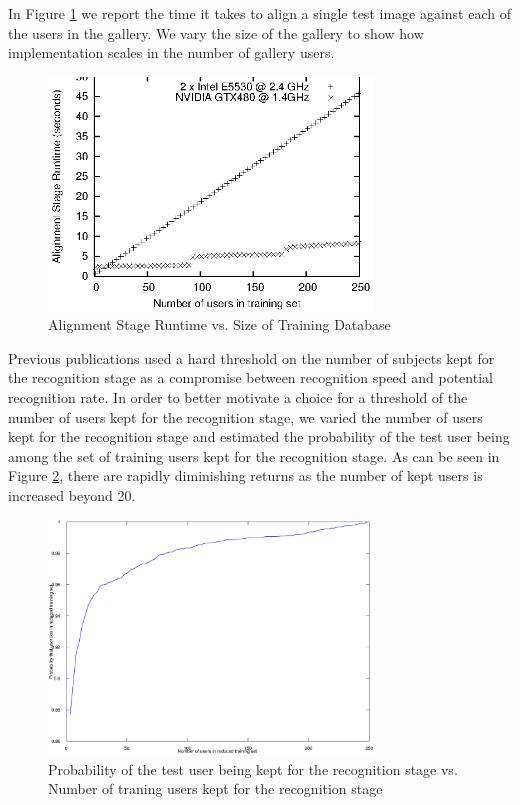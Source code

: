 \documentclass[10pt,twocolumn,letterpaper]{article}
\begin{document}
In Figure \ref{fig:alignment_stage_runtime} we report the time it takes
to align a single test image against each of the users in the gallery.
We vary the size of the gallery to show how implementation scales in the
number of gallery users.
\begin{figure}
\centering
\includegraphics[width=3.4in]{figures/alignment_runtime_graph}
\caption{Alignment Stage Runtime vs. Size of Training Database}
\label{fig:alignment_stage_runtime}
\end{figure}

Previous publications used a hard threshold on the number of subjects kept for the recognition
stage as a compromise between recognition speed and potential recognition rate.
In order to better motivate 
a choice for a threshold of the number of users kept for the recognition stage,
we varied the number of users kept for the recognition stage and estimated the probability
of the test user being among the set of training users kept for the recognition stage.
As can be seen in Figure \ref{fig:user_alignment_rank_plot}, there are rapidly diminishing
returns as the number of kept users is increased beyond 20.  
\begin{figure}
\centering
\includegraphics[width=3.4in]{figures/user_alignment_rank_plot}
\caption{Probability of the test user being kept for the recognition stage vs. Number of traning
users kept for the recognition stage}
\label{fig:user_alignment_rank_plot}
\end{figure}
\end{document}
